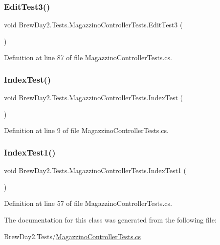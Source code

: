 \subsubsection{\texorpdfstring{Edit\+Test3()}{EditTest3()}}
{\footnotesize\ttfamily void Brew\+Day2.\+Tests.\+Magazzino\+Controller\+Tests.\+Edit\+Test3 (\begin{DoxyParamCaption}{ }\end{DoxyParamCaption})}



Definition at line 87 of file Magazzino\+Controller\+Tests.\+cs.

\mbox{\label{class_brew_day2_1_1_tests_1_1_magazzino_controller_tests_ac14fcccb97016fafaa0e5909742c7a1d}} 
\subsubsection{\texorpdfstring{Index\+Test()}{IndexTest()}}
{\footnotesize\ttfamily void Brew\+Day2.\+Tests.\+Magazzino\+Controller\+Tests.\+Index\+Test (\begin{DoxyParamCaption}{ }\end{DoxyParamCaption})}



Definition at line 9 of file Magazzino\+Controller\+Tests.\+cs.

\mbox{\label{class_brew_day2_1_1_tests_1_1_magazzino_controller_tests_ac7606c062246a9a336e6815c23cfb673}} 
\subsubsection{\texorpdfstring{Index\+Test1()}{IndexTest1()}}
{\footnotesize\ttfamily void Brew\+Day2.\+Tests.\+Magazzino\+Controller\+Tests.\+Index\+Test1 (\begin{DoxyParamCaption}{ }\end{DoxyParamCaption})}



Definition at line 57 of file Magazzino\+Controller\+Tests.\+cs.



The documentation for this class was generated from the following file\+:\begin{DoxyCompactItemize}
\item 
Brew\+Day2.\+Tests/\mbox{\hyperlink{_brew_day2_8_tests_2_magazzino_controller_tests_8cs}{Magazzino\+Controller\+Tests.\+cs}}\end{DoxyCompactItemize}
